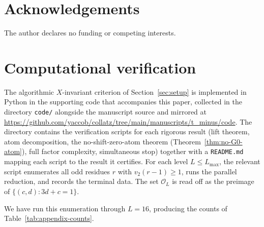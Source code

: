 \documentclass[11pt,reqno]{amsart}
\theoremstyle{plain}
\theoremstyle{definition}
\theoremstyle{remark}
\newcommand{\Obs}{\mathcal{O}}
\newcommand{\vtwo}{v_{2}}
\begin{document}
\section*{Acknowledgements}

The author declares no funding or competing interests.

\appendix
\section{Computational verification}
\label{sec:appendix}

The algorithmic $X$-invariant criterion of Section~\ref{sec:setup} is
implemented in Python in the supporting code that accompanies this paper,
collected in the directory \texttt{code/} alongside the manuscript source
and mirrored at
\url{https://github.com/yaccob/collatz/tree/main/manuscripts/t_minus/code}.
The directory contains the verification
scripts for each rigorous result (lift theorem, atom decomposition,
the no-shift-zero-atom theorem (Theorem~\ref{thm:no-G0-atom}), full factor
complexity, simultaneous stop) together with a
\texttt{README.md} mapping each script to the result it certifies. For
each level $L \le L_{\max}$, the relevant script enumerates all odd
residues $r$ with $\vtwo(r-1) \ge 1$, runs the parallel reduction, and
records the terminal data. The set $\Obs_L$ is read off as the preimage of
$\{(c, d) : 3d + c = 1\}$.

We have run this enumeration through $L = 16$, producing the counts of
Table~\ref{tab:appendix-counts}.
\end{document}
